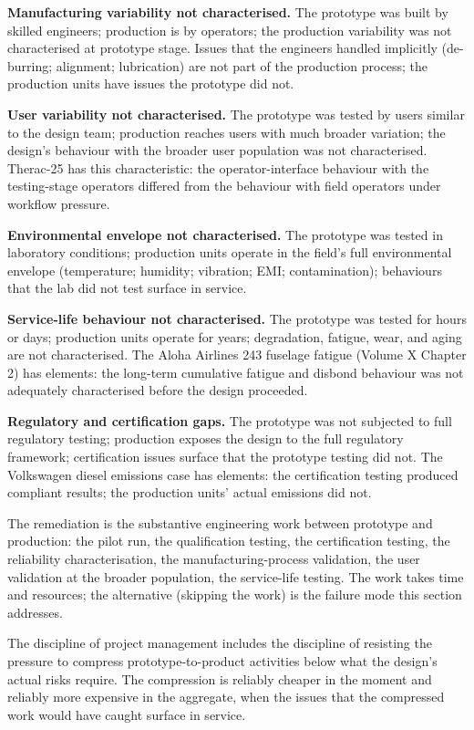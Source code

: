 \textbf{Manufacturing variability not characterised.} The prototype was built by skilled engineers; production is by operators; the production variability was not characterised at prototype stage. Issues that the engineers handled implicitly (de-burring; alignment; lubrication) are not part of the production process; the production units have issues the prototype did not.

\textbf{User variability not characterised.} The prototype was tested by users similar to the design team; production reaches users with much broader variation; the design's behaviour with the broader user population was not characterised. Therac-25 has this characteristic: the operator-interface behaviour with the testing-stage operators differed from the behaviour with field operators under workflow pressure.

\textbf{Environmental envelope not characterised.} The prototype was tested in laboratory conditions; production units operate in the field's full environmental envelope (temperature; humidity; vibration; EMI; contamination); behaviours that the lab did not test surface in service.

\textbf{Service-life behaviour not characterised.} The prototype was tested for hours or days; production units operate for years; degradation, fatigue, wear, and aging are not characterised. The Aloha Airlines 243 fuselage fatigue (Volume X Chapter 2) has elements: the long-term cumulative fatigue and disbond behaviour was not adequately characterised before the design proceeded.

\textbf{Regulatory and certification gaps.} The prototype was not subjected to full regulatory testing; production exposes the design to the full regulatory framework; certification issues surface that the prototype testing did not. The Volkswagen diesel emissions case has elements: the certification testing produced compliant results; the production units' actual emissions did not.

The remediation is the substantive engineering work between prototype and production: the pilot run, the qualification testing, the certification testing, the reliability characterisation, the manufacturing-process validation, the user validation at the broader population, the service-life testing. The work takes time and resources; the alternative (skipping the work) is the failure mode this section addresses.

The discipline of project management includes the discipline of resisting the pressure to compress prototype-to-product activities below what the design's actual risks require. The compression is reliably cheaper in the moment and reliably more expensive in the aggregate, when the issues that the compressed work would have caught surface in service.


